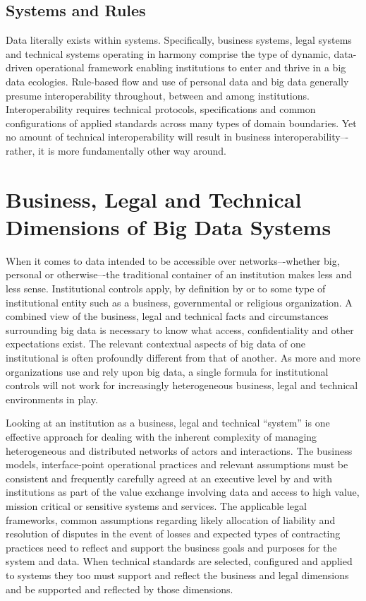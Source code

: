 \subsection{Systems and Rules}

Data literally exists within systems.
Specifically, business systems, legal systems and technical systems operating in harmony comprise the type of dynamic, data-driven operational framework enabling institutions to enter and thrive in a big data ecologies.
Rule-based flow and use of personal data and big data generally presume interoperability throughout, between and among institutions.
Interoperability requires technical protocols, specifications and common configurations of applied standards across many types of domain boundaries.
Yet no amount of technical interoperability will result in business interoperability–-rather, it is more fundamentally other way around.

\section{Business, Legal and Technical Dimensions of Big Data Systems}

When it comes to data intended to be accessible over networks–-whether big, personal or otherwise–-the traditional container of an institution makes less and less sense.
Institutional controls apply, by definition by or to some type of institutional entity such as a business, governmental or religious organization.
A combined view of the business, legal and technical facts and circumstances surrounding big data is necessary to know what access, confidentiality and other expectations exist.
The relevant contextual aspects of big data of one institutional is often profoundly different from that of another.
As more and more organizations use and rely upon big data, a single formula for institutional controls will not work for increasingly heterogeneous business, legal and technical environments in play.

Looking at an institution as a business, legal and technical “system” is one effective approach for dealing with the inherent complexity of managing heterogeneous and distributed networks of actors and interactions.
The business models, interface-point operational practices and relevant assumptions must be consistent and frequently carefully agreed at an executive level by and with institutions as part of the value exchange involving data and access to high value, mission critical or sensitive systems and services.
The applicable legal frameworks, common assumptions regarding likely allocation of liability and resolution of disputes in the event of losses and expected types of contracting practices need to reflect and support the business goals and purposes for the system and data.
When technical standards are selected, configured and applied to systems they too must support and reflect the business and legal dimensions and be supported and reflected by those dimensions.

